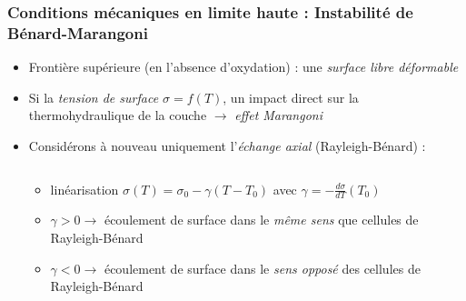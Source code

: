 \subsubsection{Conditions mécaniques en limite haute : Instabilité de Bénard-Marangoni}
\begin{frame}[fragile]
\begin{itemize}
  \item Frontière supérieure (en l'absence d'oxydation) : une \emph{surface libre déformable}
  \item Si la \emph{tension de surface $\sigma=f(T)$}, un impact direct sur la thermohydraulique de la couche $\rightarrow$ \emph{effet Marangoni}
  \item Considérons à nouveau uniquement l'\emph{échange axial} (Rayleigh-Bénard) :
\begin{columns}[T]
    \begin{column}{0.65\textwidth}
\begin{itemize}
\item linéarisation {\scriptsize $\sigma(T) =\sigma_0 - \gamma \left(T-T_0\right)$} avec \emph{$\gamma=-\frac{d\sigma}{dT}(T_0)$}
\item \emph{$\gamma > 0 \rightarrow$} écoulement de surface dans le \emph{même sens} que cellules de Rayleigh-Bénard
\item \emph{$\gamma < 0 \rightarrow$} écoulement de surface dans le \emph{sens opposé} des cellules de Rayleigh-Bénard

\end{itemize}
\end{column}
\end{columns}
\end{itemize}
\end{frame}
